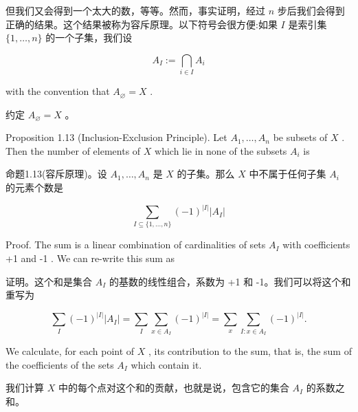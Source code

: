 \documentclass[10pt]{article}
\begin{document}
\begin{tcolorbox}\relax
但我们又会得到一个太大的数，等等。然而，事实证明，经过 \(n\) 步后我们会得到正确的结果。这个结果被称为容斥原理。以下符号会很方便:如果 \(I\) 是索引集 \(\{ 1,\ldots ,n\}\) 的一个子集，我们设
\end{tcolorbox}

\[
{A}_{I} \mathrel{\text{ := }} \mathop{\bigcap }\limits_{{i \in  I}}{A}_{i}
\]

with the convention that \({A}_{\varnothing } = X\) .

\begin{tcolorbox}\relax
约定 \({A}_{\varnothing } = X\) 。
\end{tcolorbox}

Proposition 1.13 (Inclusion-Exclusion Principle). Let \({A}_{1},\ldots ,{A}_{n}\) be subsets of \(X\) . Then the number of elements of \(X\) which lie in none of the subsets \({A}_{i}\) is

\begin{tcolorbox}\relax
命题1.13(容斥原理)。设 \({A}_{1},\ldots ,{A}_{n}\) 是 \(X\) 的子集。那么 \(X\) 中不属于任何子集 \({A}_{i}\) 的元素个数是
\end{tcolorbox}

\[
\mathop{\sum }\limits_{{I \subseteq  \{ 1,\ldots ,n\} }}{\left( -1\right) }^{\left| I\right| }\left| {A}_{I}\right| \tag{1.19}
\]

Proof. The sum is a linear combination of cardinalities of sets \({A}_{I}\) with coefficients +1 and -1 . We can re-write this sum as

\begin{tcolorbox}\relax
证明。这个和是集合 \({A}_{I}\) 的基数的线性组合，系数为 +1 和 -1。我们可以将这个和重写为
\end{tcolorbox}

\[
\mathop{\sum }\limits_{I}{\left( -1\right) }^{\left| I\right| }\left| {A}_{I}\right|  = \mathop{\sum }\limits_{I}\mathop{\sum }\limits_{{x \in  {A}_{I}}}{\left( -1\right) }^{\left| I\right| } = \mathop{\sum }\limits_{x}\mathop{\sum }\limits_{{I : x \in  {A}_{I}}}{\left( -1\right) }^{\left| I\right| }.
\]

We calculate, for each point of \(X\) , its contribution to the sum, that is, the sum of the coefficients of the sets \({A}_{I}\) which contain it.

\begin{tcolorbox}\relax
我们计算 \(X\) 中的每个点对这个和的贡献，也就是说，包含它的集合 \({A}_{I}\) 的系数之和。
\end{tcolorbox}
\end{document}
